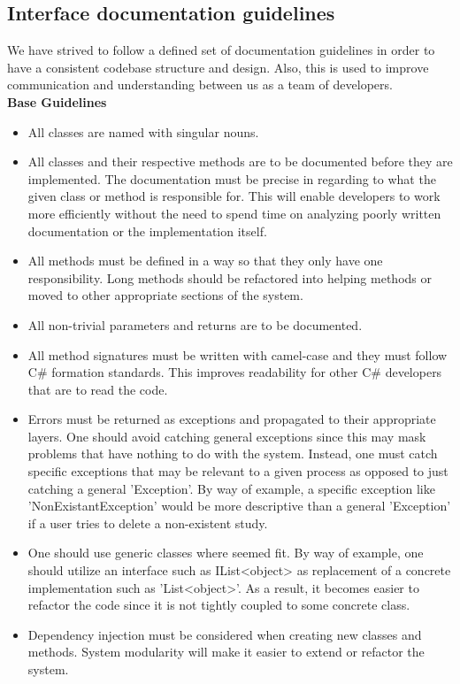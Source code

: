 \subsection{Interface documentation guidelines}
We have strived to follow a defined set of documentation guidelines in order to have a consistent codebase structure and design. Also, this is used to improve communication and understanding between us as a team of developers. \\

\textbf{Base Guidelines}

\begin{itemize}
	\item All classes are named with singular nouns.
	\item All classes and their respective methods are to be documented before they are implemented. The documentation must be precise in regarding to what the given class or method is responsible for. This will enable developers to work more efficiently without the need to spend time on analyzing poorly written documentation or the implementation itself.
	\item All methods must be defined in a way so that they only have one responsibility. Long methods should be refactored into helping methods or moved to other appropriate sections of the system.
	\item All non-trivial parameters and returns are to be documented.
	\item All method signatures must be written with camel-case and they must follow C\# formation standards. This improves readability for other C\# developers that are to read the code.
	\item Errors must be returned as exceptions and propagated to their appropriate layers. One should avoid catching general exceptions since this may mask problems that have nothing to do with the system. Instead, one must catch specific exceptions that may be relevant to a given process as opposed to just catching a general 'Exception'. By way of example, a specific exception like 'NonExistantException' would be more descriptive than a general 'Exception' if a user tries to delete a non-existent study. 
	\item One should use generic classes where seemed fit. By way of example, one should utilize an interface such as IList<object> as replacement of a concrete implementation such as 'List<object>'. As a result, it becomes easier to refactor the code since it is not tightly coupled to some concrete class.
	\item Dependency injection must be considered when creating new classes and methods. System modularity will make it easier to extend or refactor the system.
	
\end{itemize}

